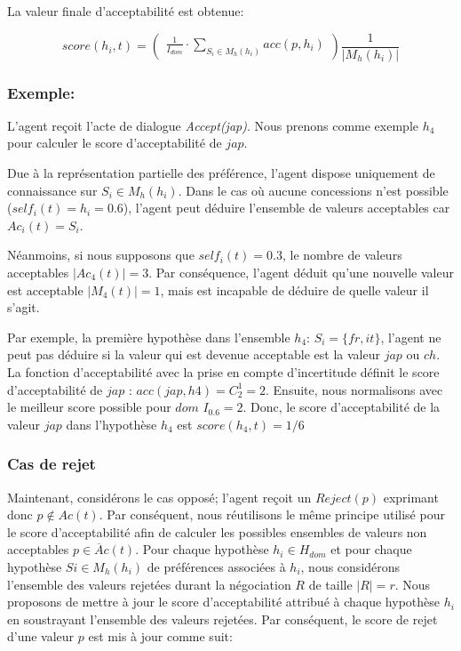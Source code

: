 La valeur finale d'acceptabilité est obtenue:

\begin{equation}
score(h_i, t)= \left( \begin{array}{c}  \frac{1}{I_{dom}} \cdot \sum_{S_i \in M_h(h_i) } acc(p, h_i) 
\end{array}\right) \frac{1}{| M_h(h_i)|}
\end{equation} 


\subsubsection{Exemple: }   
L'agent reçoit l'acte de dialogue \emph{Accept(jap)}. Nous prenons comme exemple $h_4$ pour calculer le score d'acceptabilité de $jap$.

Due à la représentation partielle des préférence, l'agent dispose uniquement de connaissance sur $S_i \in M_h(h_i)$.
Dans le cas où aucune concessions n'est possible ($self_i(t)=h_i =0.6$), l'agent peut déduire l'ensemble de valeurs acceptables car $Ac_i(t) = S_i$.

Néanmoins, si nous supposons que  $self_i(t)=0.3$, le nombre de valeurs acceptables $|Ac_4(t)| = 3$.  Par conséquence, l'agent déduit qu'une nouvelle valeur est acceptable $|M_4(t)|=1$, mais est incapable de déduire de quelle valeur il s'agit. 

Par exemple, la première hypothèse dans l'ensemble $h_4$: $S_i = \{fr, it\}$, l'agent ne peut pas déduire si la valeur qui est devenue acceptable est la valeur $jap$ ou $ch$. La fonction d'acceptabilité avec la prise en compte d'incertitude définit le score d'acceptabilité de $jap$ : 
$ acc(jap, h4) = C^1_2 = 2$. Ensuite, nous normalisons avec le meilleur score possible pour $dom$ $I_{0.6}=2$. Donc, le score d'acceptabilité de la valeur $jap$ dans l'hypothèse $h_4$ est $score(h_4,t)= 1/6$

\subsubsection{Cas de rejet}
Maintenant, considérons le cas opposé; l'agent reçoit un $Reject(p)$ exprimant donc $p \not \in Ac(t)$. Par conséquent, nous réutilisons le même principe utilisé pour le score d'acceptabilité afin de calculer les possibles ensembles de valeurs non acceptables $ p \in \overline Ac(t)$. Pour chaque hypothèse $h_i \in H_{dom}$ et pour chaque hypothèse $Si \in M_h(h_i)$ de préférences associées à $h_i$, nous considérons l'ensemble des valeurs rejetées durant la négociation $R$ de taille $ |R| = r$. Nous proposons de mettre à jour le score d'acceptabilité attribué à chaque hypothèse $h_i$ en soustrayant l'ensemble des valeurs rejetées.
Par conséquent, le score de rejet d'une valeur $p$ est mis à jour comme suit:

